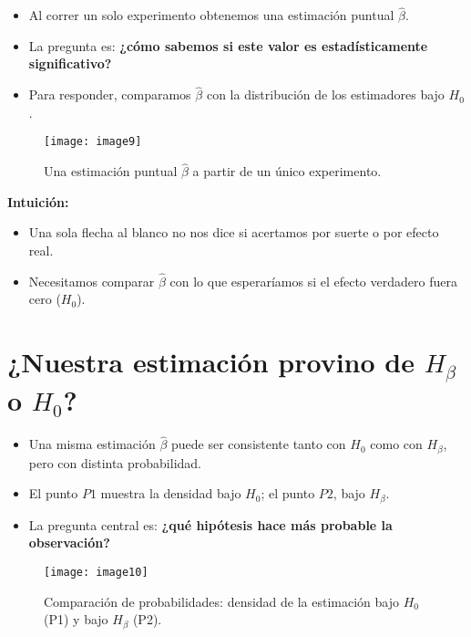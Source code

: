 \documentclass[12pt]{article}
\begin{document}
\begin{itemize}
    \item Al correr un solo experimento obtenemos una estimación puntual $\hat{\beta}$.  
    \item La pregunta es: \textbf{¿cómo sabemos si este valor es estadísticamente significativo?}  
    \item Para responder, comparamos $\hat{\beta}$ con la distribución de los estimadores bajo $H_0$.  
\end{itemize}

\begin{figure}[H]
\centering
\texttt{[image: image9]}
\caption{\footnotesize Una estimación puntual $\hat{\beta}$ a partir de un único experimento.}
\end{figure}

\textbf{Intuición:}
\begin{itemize}
    \item Una sola flecha al blanco no nos dice si acertamos por suerte o por efecto real.  
    \item Necesitamos comparar $\hat{\beta}$ con lo que esperaríamos si el efecto verdadero fuera cero ($H_0$).
\end{itemize}

\section*{\noindent\textbf{¿Nuestra estimación provino de $H_\beta$ o $H_0$?}}

\begin{itemize}
    \item Una misma estimación $\hat{\beta}$ puede ser consistente tanto con $H_0$ como con $H_\beta$, pero con distinta probabilidad.  
    \item El punto $P1$ muestra la densidad bajo $H_0$; el punto $P2$, bajo $H_\beta$.  
    \item La pregunta central es: \textbf{¿qué hipótesis hace más probable la observación?}  
\end{itemize}

\begin{figure}[H]
\centering
\texttt{[image: image10]}
\caption{\footnotesize Comparación de probabilidades: densidad de la estimación bajo $H_0$ (P1) y bajo $H_\beta$ (P2).}
\end{figure}
\end{document}
